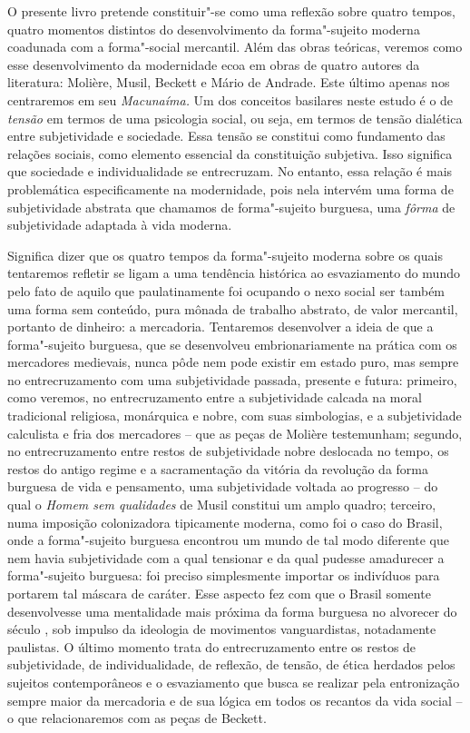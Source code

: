 O presente livro pretende constituir"-se como uma reflexão sobre quatro
tempos, quatro momentos distintos do desenvolvimento da forma"-sujeito
moderna coadunada com a forma"-social mercantil. Além das obras teóricas,
veremos como esse desenvolvimento da modernidade ecoa em obras de quatro
autores da literatura: Molière, Musil, Beckett e Mário de Andrade. Este
último apenas nos centraremos em seu \emph{Macunaíma.} Um dos conceitos
basilares neste estudo é o de \emph{tensão} em termos de uma psicologia
social, ou seja, em termos de tensão dialética entre subjetividade e
sociedade. Essa tensão se constitui como fundamento das relações
sociais, como elemento essencial da constituição subjetiva. Isso
significa que sociedade e individualidade se entrecruzam. No entanto,
essa relação é mais problemática especificamente na modernidade, pois
nela intervém uma forma de subjetividade abstrata que chamamos de
forma"-sujeito burguesa, uma \emph{fôrma} de subjetividade adaptada à
vida moderna.

Significa dizer que os quatro tempos da forma"-sujeito moderna sobre os
quais tentaremos refletir se ligam a uma tendência histórica ao
esvaziamento do mundo pelo fato de aquilo que paulatinamente foi
ocupando o nexo social ser também uma forma sem conteúdo, pura mônada de
trabalho abstrato, de valor mercantil, portanto de dinheiro: a
mercadoria. Tentaremos desenvolver a ideia de que a forma"-sujeito
burguesa, que se desenvolveu embrionariamente na prática com os
mercadores medievais, nunca pôde nem pode existir em estado puro, mas
sempre no entrecruzamento com uma subjetividade passada, presente e
futura: primeiro, como veremos, no entrecruzamento entre a subjetividade
calcada na moral tradicional religiosa, monárquica e nobre, com suas
simbologias, e a subjetividade calculista e fria dos mercadores -- que
as peças de Molière testemunham; segundo, no entrecruzamento entre
restos de subjetividade nobre deslocada no tempo, os restos do antigo
regime e a sacramentação da vitória da revolução da forma burguesa de
vida e pensamento, uma subjetividade voltada ao progresso -- do qual o
\emph{Homem sem qualidades} de Musil constitui um amplo quadro;
terceiro, numa imposição colonizadora tipicamente moderna, como foi o
caso do Brasil, onde a forma"-sujeito burguesa encontrou um mundo de tal
modo diferente que nem havia subjetividade com a qual tensionar e da
qual pudesse amadurecer a forma"-sujeito burguesa: foi preciso
simplesmente importar os indivíduos para portarem tal máscara de
caráter. Esse aspecto fez com que o Brasil somente desenvolvesse uma
mentalidade mais próxima da forma burguesa no alvorecer do século ,
sob impulso da ideologia de movimentos vanguardistas, notadamente
paulistas. O último momento trata do entrecruzamento entre os restos de
subjetividade, de individualidade, de reflexão, de tensão, de ética
herdados pelos sujeitos contemporâneos e o esvaziamento que busca se
realizar pela entronização sempre maior da mercadoria e de sua lógica em
todos os recantos da vida social -- o que relacionaremos com as peças de
Beckett.

